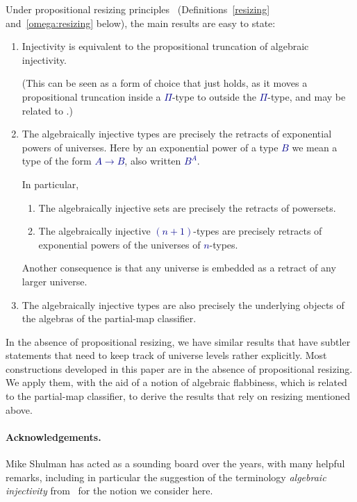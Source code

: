 \documentclass[10pt]{article}
\newcommand{\db}{\textcolor{darkblue}}
\newcommand{\m}[1]{\db{$#1$}}
\theoremstyle{definition}
\begin{document}
Under propositional resizing principles~\cite{hottbook}
(Definitions~\ref{resizing} and~\ref{omega:resizing} below), the main
results are easy to state:
\begin{enumerate}
\item Injectivity is equivalent to the propositional truncation of
  algebraic injectivity.

  (This can be seen as a form of choice that
  just holds, as it moves a propositional truncation inside a
  \m{\Pi}-type to outside the \m{\Pi}-type, and may be related to
  \cite{kenney:2011}.)
   \item The algebraically injective types are precisely the retracts of
     exponential powers of universes. Here by an exponential power of a type \m{B} we mean a type of the form \m{A \to B}, also written \m{B^A}.

     In particular,
       \begin{enumerate}
       \item The algebraically injective sets are precisely the
         retracts of powersets.

       \item The algebraically injective \m{(n+1)}-types are precisely
         retracts of exponential powers of the universes of \m{n}-types.
       \end{enumerate}
     Another consequence is that any universe is embedded as a retract of any
     larger universe.
   \item The algebraically injective types are also precisely the
       underlying objects of the algebras of the partial-map
       classifier.
\end{enumerate}
In the absence of propositional resizing, we have similar results
that have subtler statements that need to keep track of universe
levels rather explicitly.
%
Most constructions developed in this paper are in the absence of
propositional resizing. We apply them, with the aid of a notion of
algebraic flabbiness, which is related to the partial-map classifier,
to derive the results that rely on resizing mentioned above.

\paragraph{Acknowledgements.} Mike Shulman has acted as a sounding
board over the years, with many helpful remarks, including in
particular the suggestion of the terminology \emph{algebraic
  injectivity} from~\cite{bourke:2017} for the notion we consider
here.
\end{document}

